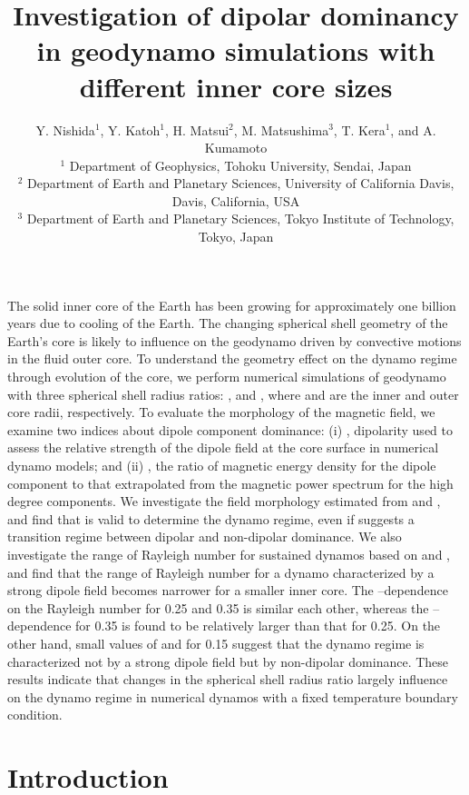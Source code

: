 \documentclass{gji}
\title{Investigation of dipolar dominancy in geodynamo simulations with different inner core sizes}
\author{Y. Nishida$^1$, Y. Katoh$^1$, H. Matsui$^2$, M. Matsushima$^3$, T. Kera$^1$, and A. Kumamoto \\
  $^1$ Department of Geophysics, Tohoku University, Sendai, Japan \\
  $^2$ Department of Earth and Planetary Sciences, University of California Davis, Davis, California, USA \\
  $^3$ Department of Earth and Planetary Sciences, Tokyo Institute of Technology, Tokyo, Japan
  }
\date{ }
\begin{document}
\maketitle
%
\begin{summary}
The solid inner core of the Earth has been growing for approximately one billion years due to cooling of the Earth. The changing spherical shell geometry of the Earth’s core is likely to influence on the geodynamo driven by convective motions in the fluid outer core. To understand the geometry effect on the dynamo regime through evolution of the core, we perform numerical simulations of geodynamo with three spherical shell radius ratios:  , and , where  and  are the inner and outer core radii, respectively. To evaluate the morphology of the magnetic field, we examine two indices about dipole component dominance: (i) , dipolarity used to assess the relative strength of the dipole field at the core surface in numerical dynamo models; and (ii) , the ratio of magnetic energy density for the dipole component to that extrapolated from the magnetic power spectrum for the high degree components. We investigate the field morphology estimated from  and , and find that  is valid to determine the dynamo regime, even if  suggests a transition regime between dipolar and non-dipolar dominance. We also investigate the range of Rayleigh number for sustained dynamos based on  and , and find that the range of Rayleigh number for a dynamo characterized by a strong dipole field becomes narrower for a smaller inner core. The –dependence on the Rayleigh number for  0.25 and 0.35 is similar each other, whereas the –dependence for  0.35 is found to be relatively larger than that for  0.25. On the other hand, small values of  and  for  0.15 suggest that the dynamo regime is characterized not by a strong dipole field but by non-dipolar dominance. These results indicate that changes in the spherical shell radius ratio largely influence on the dynamo regime in numerical dynamos with a fixed temperature boundary condition.
\end{summary}
%
\section{Introduction}
\end{document}
